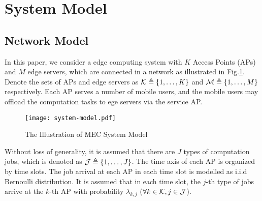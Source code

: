 \section{System Model}
\subsection{Network Model}
In this paper, we consider a edge computing system with $K$ Access Points (APs) and $M$ edge servers, which are connected in a network as illustrated in Fig.\ref{fig:system}.
Denote the sets of APs and edge servers as $\mathcal{K} \triangleq \{1,\dots,K\}$ and $\mathcal{M} \triangleq \{1,\dots,M\}$ respectively.
Each AP serves a number of mobile users, and the mobile users may offload the computation tasks to ege servers via the service AP.

\begin{figure}[ht]
    \centering
    \texttt{[image: system-model.pdf]}
    \caption{The Illustration of MEC System Model}
    \label{fig:system}
\end{figure}


Without loss of generality, it is assumed that there are $J$ types of computation jobs, which is denoted as $\mathcal{J} \triangleq \{1,\dots,J\}$.
The time axis of each AP is organized by time slots. The job arrival at each AP in each time slot is modelled as i.i.d Bernoulli distribution.
It is assumed that in each time slot, the $j$-th type of jobs arrive at the $k$-th AP with probability $\lambda_{k,j}$ ($\forall k\in\mathcal{K}, j\in\mathcal{J}$).


